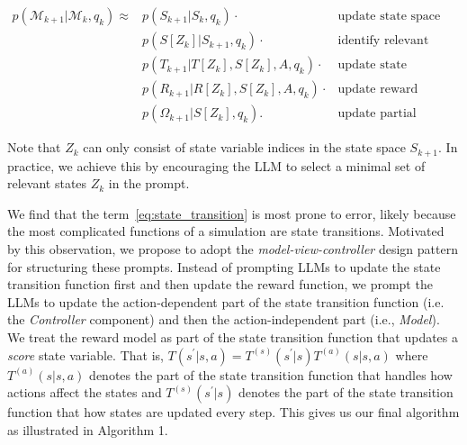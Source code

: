 \documentclass{article}
\theoremstyle{plain}
\theoremstyle{definition}
\theoremstyle{remark}
\begin{document}
\begin{align}
  p(\mathcal{M}_{k+1} | \mathcal{M}_k, q_k) \approx  & p(S_{k+1}| S_k, q_k) \cdot  & \text{update state space} \label{eq:update_state_space}\\
   &  p( S\left[Z_{k}\right] | S_{k+1}, q_k) \cdot  & \text{identify relevant state variables} \label{eq:identify_scope} \\ 
   & p(T_{k+1} | T[Z_{k}], S\left[Z_{k}\right], A, q_k) \cdot  & \text{update state transition function} \label{eq:state_transition} \\ 
   & p(R_{k+1} | R[Z_{k}], S\left[Z_{k}\right], A, q_k) \cdot    & \text{update reward function} \label{eq:reward_function} \\ 
   & p(\Omega_{k+1} | S\left[Z_{k}\right], q_k).   & \text{update partial observation function} \label{eq:rendering}
\end{align}

Note that $Z_k$ can only consist of state variable indices in the state space $S_{k+1}$. In practice, we achieve this by encouraging the LLM to select a minimal set of relevant states $Z_k$ in the prompt.



We find that the term~\ref{eq:state_transition} is most prone to error, likely because the most complicated functions of a simulation are state transitions. Motivated by this observation, we propose to adopt the \textit{model-view-controller} design pattern for structuring these prompts. Instead of prompting LLMs to update the state transition function first and then update the reward function, we prompt the LLMs to update the action-dependent part of the state transition function (i.e. the \textit{Controller} component) and then the action-independent part (i.e., \textit{Model}). We treat the reward model as part of the state transition function that updates a \textit{score} state variable. That is, $T(s^\prime | s, a) = T^{(s)}(s^\prime | s) T^{(a)}(s | s, a)$ where $T^{(a)}(s | s,a)$ denotes the part of the state transition function that handles how actions affect the states and $T^{(s)}(s^\prime | s)$ denotes the part of the state transition function that how states are updated every step. This gives us our final algorithm as illustrated in Algorithm 1.
\end{document}
